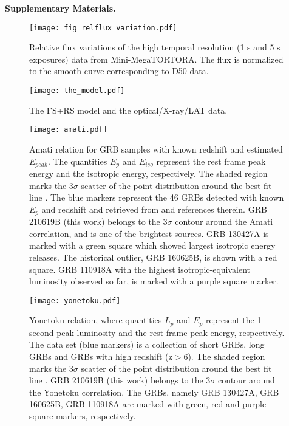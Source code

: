 \documentclass{naturesubmissionstyle}
\begin{document}
\newpage 

{\noindent  \bf Supplementary Materials.}

\begin{figure}[ht!]
    \centering
    \texttt{[image: fig\_relflux\_variation.pdf]}
    \caption{Relative flux variations of the high temporal resolution (1 s and 5 s exposures) data from Mini-MegaTORTORA. The flux is normalized to the smooth curve corresponding to D50 data.}
    \label{fig:relflux_variation}
\end{figure}

\begin{figure}[ht!]
    \centering
    \texttt{[image: the\_model.pdf]}
    \caption{The FS+RS model and the optical/X-ray/LAT data. 
    }
    \label{the_model}
\end{figure}

\newpage 

\begin{figure}[ht!]
    \centering
    \texttt{[image: amati.pdf]}
    \caption{Amati relation for GRB samples with known redshift and estimated $E_{peak}$. The quantities $E_{p}$ and $E_{iso}$ represent the rest frame peak energy and the isotropic energy, respectively. 
    The shaded region marks the 3$\sigma$ scatter of the point distribution
around the best fit line \cite{2012MNRAS.421.1256N}. The blue markers represent the 46 GRBs detected with known $E_p$ and redshift and retrieved from \cite{2012MNRAS.421.1256N} and references therein.
GRB 210619B (this work) belongs to the 3$\sigma$ contour around the Amati correlation, and is one of the brightest sources.
GRB 130427A\cite{2014Sci...343...48M} is marked with a green square which showed largest isotropic energy releases. 
The historical outlier, GRB 160625B\cite{2018NatAs...2...69Z}, is shown with a red square.
GRB 110918A\cite{2013ApJ...779..151F} with the highest isotropic-equivalent luminosity observed so far, is marked with a purple square marker. }
    \label{fig:Amati}
\end{figure}


\newpage 

\begin{figure}[ht!]
    \centering
    \texttt{[image: yonetoku.pdf]}
    \caption{
    Yonetoku relation, where quantities $L_{p}$ and $E_{p}$ represent the 1-second peak luminosity and the  rest frame peak energy, respectively. 
    The data set\cite{2010PASJ...62.1495Y} (blue markers) is a collection of short GRBs, long GRBs and GRBs with high redshift (z$>$6).
    The shaded region marks the 3$\sigma$ scatter of the point distribution
around the best fit line \cite{2010PASJ...62.1495Y}. 
GRB 210619B (this work) belongs to the 3$\sigma$ contour around the Yonetoku correlation.
The GRBs, namely GRB 130427A\cite{2014Sci...343...48M}, GRB 160625B\cite{2018NatAs...2...69Z}, GRB 110918A\cite{2013ApJ...779..151F} are marked with
green, red and purple square markers, respectively.
    }
    \label{fig:Yonetoku}
\end{figure}
\end{document}
